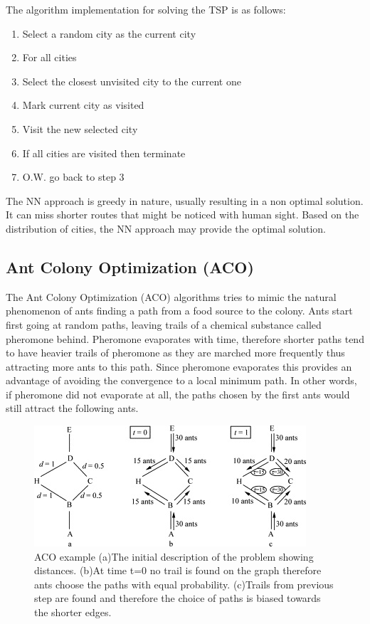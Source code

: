 \documentclass[twocolumn]{article}
\begin{document}
	The algorithm implementation for solving the TSP is as follows:
	\begin{enumerate}
		\item Select a random city as the current city
		\item For all cities
		\item Select the closest unvisited city to the current one
		\item Mark current city as visited
		\item Visit the new selected city
		\item If all cities are visited then terminate
		\item O.W. go back to step 3
	\end{enumerate}
	
	The NN approach is greedy in nature, usually resulting in a non optimal solution. It can miss shorter routes that might be noticed with human sight. Based on the distribution of cities, the NN approach may provide the optimal solution.
	
	\subsection{Ant Colony Optimization (ACO)}
	The Ant Colony Optimization (ACO) algorithms tries to mimic the natural phenomenon of ants finding a path from a food source to the colony. Ants start first going at random paths, leaving trails of a chemical substance called pheromone behind. Pheromone evaporates with time, therefore shorter paths tend to have heavier trails of pheromone as they are marched more frequently thus attracting more ants to this path. Since pheromone evaporates this provides an advantage of avoiding the convergence to a local minimum path. In other words, if pheromone did not evaporate at all, the paths chosen by the first ants would still attract the following ants.
	
	\begin{figure}[h!]
		\centering
		\includegraphics[scale=0.8]{./ACOexample.jpg}
		\caption{ACO example\cite{ACOExample} (a)The initial description of the problem showing distances. (b)At time t=0 no trail is found on the graph therefore ants choose the paths with equal probability. (c)Trails from previous step are found and therefore the choice of paths is biased towards the shorter edges.}
		\label{fig:ACOexample}
	\end{figure}
	
\end{document}
